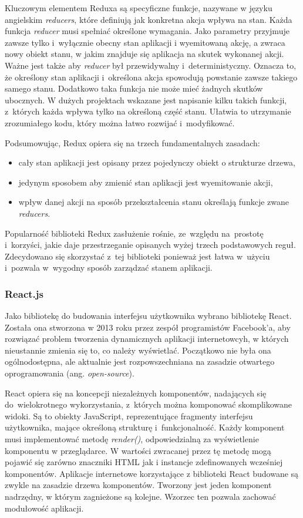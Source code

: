 \documentclass[12pt,a4paper,polish,thesis]{dcsbook}
\begin{document}
{	Kluczowym elementem Reduxa są specyficzne funkcje, nazywane w języku angielskim \textit{reducers}, które definiują jak konkretna akcja wpływa na stan. Każda funkcja \textit{reducer} musi spełniać określone wymagania. Jako parametry przyjmuje zawsze tylko i~wyłącznie obecny stan aplikacji i wyemitowaną akcję, a zwraca nowy obiekt stanu, w jakim znajduje się aplikacja na skutek wykonanej akcji. Ważne jest także aby \textit{reducer} był przewidywalny i~deterministyczny. Oznacza to, że określony stan aplikacji i~określona akcja spowodują powstanie zawsze takiego samego stanu. Dodatkowo taka funkcja nie może mieć żadnych skutków ubocznych. W dużych projektach wskazane jest napisanie kilku takich funkcji, z~których każda wpływa tylko na określoną część stanu. Ułatwia to utrzymanie zrozumiałego kodu, który można łatwo rozwijać i~modyfikować.

	Podsumowując, Redux opiera się na trzech fundamentalnych zasadach:
	\begin{itemize}
		\item cały stan aplikacji jest opisany przez pojedynczy obiekt o strukturze drzewa,
		\item jedynym sposobem aby zmienić stan aplikacji jest wyemitowanie akcji,
		\item wpływ danej akcji na sposób przekształcenia stanu określają funkcje zwane \textit{reducers}.
	\end{itemize}

	Popularność biblioteki Redux zasłużenie rośnie, ze~względu na~prostotę i~korzyści, jakie daje przestrzeganie opisanych wyżej trzech podstawowych reguł. Zdecydowano się skorzystać z~tej biblioteki ponieważ jest łatwa w~użyciu i~pozwala w~wygodny sposób zarządzać stanem aplikacji.

	\subsubsection{React.js}

	 Jako bibliotekę do budowania interfejsu użytkownika wybrano bibliotekę React.
	 Została ona stworzona w 2013 roku przez zespół programistów Facebook'a, aby rozwiązać problem tworzenia dynamicznych aplikacji internetowcyh, w których nieustannie zmienia się to, co należy wyświetlać. Początkowo nie była ona ogólnodostępna, ale aktualnie jest rozpowszechniana na zasadzie otwartego oprogramowania (ang. \textit{open-source}).

   React opiera się na koncepcji niezależnych komponentów, nadających się do~wielokrotnego wykorzystania, z~których można komponować skomplikowane widoki. Są to obiekty JavaScript, reprezentujące fragmenty interfejsu użytkownika, mające określoną strukturę i~funkcjonalność. Każdy komponent musi implementować metodę \textit{render()}, odpowiedzialną za wyświetlenie komponentu w przeglądarce. W wartości zwracanej przez tę metodę mogą pojawić się zarówno znaczniki HTML jak i instancje zdefinowanych wcześniej komponentów. Aplikacje internetowe korzystające z biblioteki React budowane są zwykle na zasadzie drzewa komponentów. Tworzony jest jeden komponent nadrzędny, w którym zagnieżone są kolejne. Wzorzec ten pozwala zachować modułowość aplikacji.

}
\end{document}
